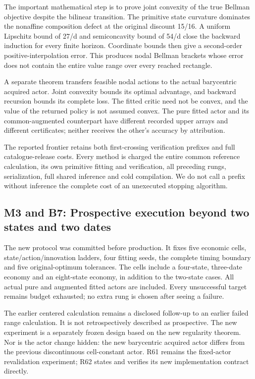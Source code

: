 The important mathematical step is to prove joint convexity of the true
Bellman objective despite the bilinear transition. The primitive state
curvature dominates the nonaffine composition defect at the original
discount 15/16. A uniform Lipschitz bound of 27/d and semiconcavity
bound of 54/d close the backward induction for every finite horizon.
Coordinate bounds then give a second-order positive-interpolation error.
This produces nodal Bellman brackets whose error does not contain the
entire value range over every reached rectangle.

A separate theorem transfers feasible nodal actions to the actual
barycentric acquired actor. Joint convexity bounds its optimal
advantage, and backward recursion bounds its complete loss. The fitted
critic need not be convex, and the value of the returned policy is not
assumed convex. The pure fitted actor and its common-augmented
counterpart have different recorded upper arrays and different
certificates; neither receives the other's accuracy by attribution.

The reported frontier retains both first-crossing verification prefixes
and full catalogue-release costs. Every method is charged the entire
common reference calculation, its own primitive fitting and
verification, all preceding rungs, serialization, full shared inference
and cold compilation. We do not call a prefix without inference the
complete cost of an unexecuted stopping algorithm.

\hypertarget{m3-and-b7-prospective-execution-beyond-two-states-and-two-dates}{%
\subsection{M3 and B7: Prospective execution beyond two states and two
dates}\label{m3-and-b7-prospective-execution-beyond-two-states-and-two-dates}}

The new protocol was committed before production. It fixes five economic
cells, state/action/innovation ladders, four fitting seeds, the complete
timing boundary and five original-optimum tolerances. The cells include
a four-state, three-date economy and an eight-state economy, in addition
to the two-state cases. All actual pure and augmented fitted actors are
included. Every unsuccessful target remains budget exhausted; no extra
rung is chosen after seeing a failure.

The earlier centered calculation remains a disclosed follow-up to an
earlier failed range calculation. It is not retrospectively described as
prospective. The new experiment is a separately frozen design based on
the new regularity theorem. Nor is the actor change hidden: the new
barycentric acquired actor differs from the previous discontinuous
cell-constant actor. R61 remains the fixed-actor revalidation
experiment; R62 states and verifies its new implementation contract
directly.


